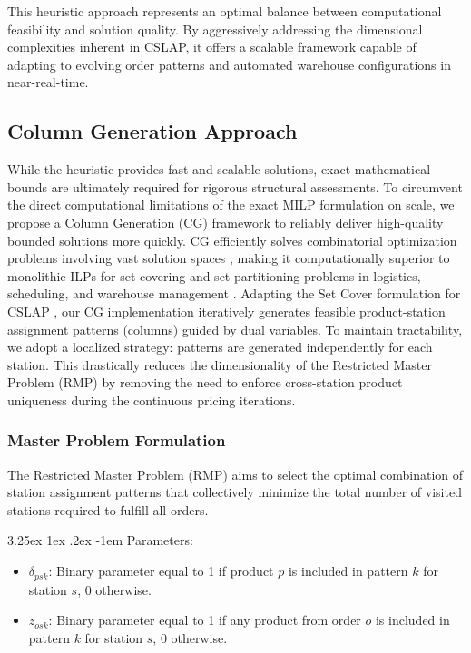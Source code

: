\documentclass[preprint,review,11pt,authoryear]{elsarticle}
\makeatletter
\renewcommand\paragraph{\@startsection{paragraph}{4}{\z@}
  {3.25ex \@plus1ex \@minus.2ex}
  {-1em}
  {\normalfont\normalsize\itshape}}
\makeatother
\begin{document}
\noindent This heuristic approach represents an optimal balance between computational feasibility and solution quality. By aggressively addressing the dimensional complexities inherent in CSLAP, it offers a scalable framework capable of adapting to evolving order patterns and automated warehouse configurations in near-real-time.



\subsection{Column Generation Approach}

While the heuristic provides fast and scalable solutions, exact mathematical bounds are ultimately required for rigorous structural assessments. To circumvent the direct computational limitations of the exact MILP formulation on scale, we propose a Column Generation (CG) framework to reliably deliver high-quality bounded solutions more quickly. CG efficiently solves combinatorial optimization problems involving vast solution spaces \cite{lubbecke2005selected}, making it computationally superior to monolithic ILPs for set-covering and set-partitioning problems in logistics, scheduling, and warehouse management \cite{desrochers1989column}.
Adapting the Set Cover formulation for CSLAP \cite{xiao2010correlated}, our CG implementation iteratively generates feasible product-station assignment patterns (columns) guided by dual variables. To maintain tractability, we adopt a localized strategy: patterns are generated independently for each station. This drastically reduces the dimensionality of the Restricted Master Problem (RMP) by removing the need to enforce cross-station product uniqueness during the continuous pricing iterations.



\subsubsection{Master Problem Formulation}

The Restricted Master Problem (RMP) aims to select the optimal combination of station assignment patterns that collectively minimize the total number of visited stations required to fulfill all orders. 

\paragraph{Parameters:}
\begin{itemize}
    \item $\delta_{psk}$: Binary parameter equal to 1 if product $p$ is included in pattern $k$ for station $s$, 0 otherwise.
    \item $z_{osk}$: Binary parameter equal to 1 if any product from order $o$ is included in pattern $k$ for station $s$, 0 otherwise.
\end{itemize}
\end{document}

